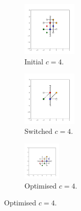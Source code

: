 \begin{figure}[h]
     \vspace{5mm}
     \begin{subfigure}[b]{0.25\textwidth}
         \centering
         \includegraphics[height=2.6cm]{./figures/general_networks/bs_move_d.pdf}
         \caption{Initial $c=4$.}
         \label{fig:bsmoved}
     \end{subfigure}
     \hfill
     \begin{subfigure}[b]{0.25\textwidth}
         \centering
         \includegraphics[height=2.6cm]{./figures/general_networks/bs_move_e.pdf}
         \caption{Switched $c=4$.}
         \label{fig:bsmovee}
     \end{subfigure}
     \hfill
     \begin{subfigure}[b]{0.25\textwidth}
         \centering
         \includegraphics[height=1.8cm]{./figures/general_networks/bs_move_f.pdf}
         \caption{Optimised $c=4$.}
         \label{fig:bsmovef}
     \end{subfigure}
     

\end{figure}
